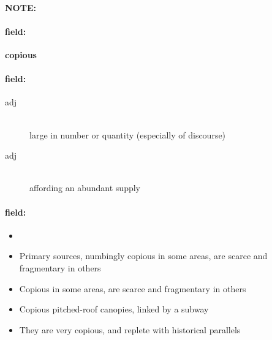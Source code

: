 \documentclass[12pt]{article}
\newenvironment{note}{\paragraph{NOTE:}}{}
\newenvironment{field}{\paragraph{field:}}{}
\begin{document}
\begin{note}
\begin{field}
\textbf{\large copious}
\end{field}


\begin{field}
\begin{description}
\item[adj] \hfill \\ 
large in number or quantity (especially of discourse)

\item[adj] \hfill \\ 
affording an abundant supply

\end{description}
\end{field}

\begin{field}
\begin{itemize}
\item 
\item Primary sources, numbingly copious in some areas, are scarce and fragmentary in others
\item Copious in some areas, are scarce and fragmentary in others
\item Copious pitched-roof canopies, linked by a subway
\item They are very copious, and replete with historical parallels
\end{itemize}
\end{field}
\end{note}
\end{document}
